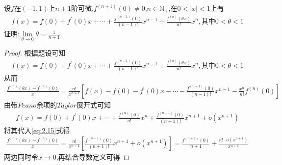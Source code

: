 \documentclass[lang=cn,newtx,10pt,scheme=chinese]{elegantbook}
\begin{document}
\begin{exercise}
    设\(f\)在\((-1,1)\)上\(n + 1\)阶可微,\(f^{(n + 1)}(0)\neq0\),\(n\in\mathbb{N}_+\),在\(0<|x|<1\)上有
    \begin{gather}
        f\left( x \right) =f\left( 0 \right) +f^{\prime}\left( 0 \right) x+\cdots +\frac{f^{\left( n-1 \right)}\left( 0 \right)}{\left( n-1 \right) !}x^{n-1}+\frac{f^{\left( n \right)}\left( \theta x \right)}{n!}x^n,\text{其中}0<\theta <1
        \nonumber
    \end{gather}
    证明:$\lim\limits_{\theta\to0}\theta=\frac{1}{n + 1}$.
\end{exercise}
    \begin{proof}
        根据题设可知
        \begin{gather}
            f\left( x \right) =f\left( 0 \right) +f^{\prime}\left( 0 \right) x+\cdots +\frac{f^{\left( n-1 \right)}\left( 0 \right)}{\left( n-1 \right) !}x^{n-1}+\frac{f^{\left( n \right)}\left( \theta x \right)}{n!}x^n,\text{其中}0<\theta <1
            \nonumber
        \end{gather}
        从而
        \begin{gather}\label{eq:2.15}
            \frac{f^{\left( n \right)}\left( \theta x \right) -f^{\left( n \right)}\left( 0 \right)}{x}=\frac{n!}{x^{n+1}}\left[ f\left( x \right) -f\left( 0 \right) -f^{\prime}\left( 0 \right) x-\cdots -\frac{f^{\left( n-1 \right)}\left( 0 \right)}{\left( n-1 \right) !}x^{n-1}-\frac{x^n}{n!}f^{\left( n \right)}\left( 0 \right) \right] 
        \end{gather}
        由带$Peano$余项的$Taylor$展开式可知
        \begin{gather}
            f\left( x \right) =f\left( 0 \right) +f^{\prime}\left( 0 \right) x+\cdots +\frac{f^{\left( n \right)}\left( 0 \right)}{n!}x^n+\frac{f^{\left( n+1 \right)}\left( 0 \right)}{\left( n+1 \right) !}x^{n+1}+o\left( x^{n+1} \right) 
            \nonumber
        \end{gather}
        将其代入\eqref{eq:2.15}式得
        \begin{gather}
            \frac{f^{\left( n \right)}\left( \theta x \right) -f^{\left( n \right)}\left( 0 \right)}{x}=\frac{n!}{x^{n+1}}\left[ \frac{f^{\left( n+1 \right)}\left( 0 \right)}{\left( n+1 \right) !}x^{n+1}+o\left( x^{n+1} \right) \right] =\frac{f^{\left( n+1 \right)}\left( 0 \right)}{n+1}+\frac{n!\cdot o\left( x^{n+1} \right)}{x^{n+1}}
            \nonumber
        \end{gather}
        两边同时令$x\to0$,再结合导数定义可得

\end{proof}
\end{document}
